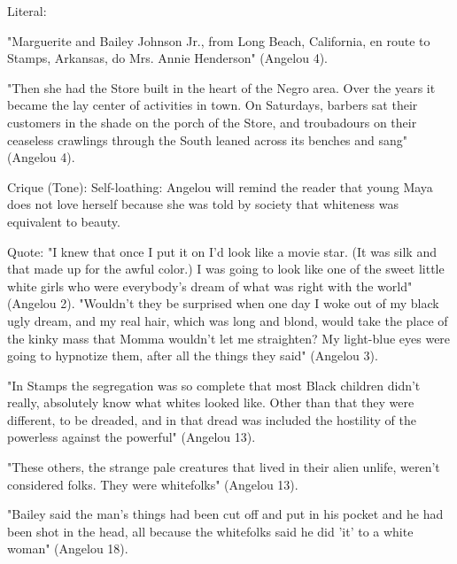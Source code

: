 
Literal:

"Marguerite and Bailey Johnson Jr., from Long Beach, California, en route to Stamps, Arkansas, do Mrs. Annie Henderson" (Angelou 4).

"Then she had the Store built in the heart of the Negro area. Over the years it became the lay center of activities in town. On Saturdays, barbers sat their customers in the shade on the porch of the Store, and troubadours on their ceaseless crawlings through the South leaned across its benches and sang" (Angelou 4).

Crique (Tone): 
Self-loathing: Angelou will remind the reader that young Maya does not love herself because she was told by society that whiteness was equivalent to beauty.

Quote:
"I knew that once I put it on I'd look like a movie star. (It was silk and that made up for the awful color.) I was going to look like one of the sweet little white girls who were everybody's dream of what was right with the world" (Angelou 2).
"Wouldn't they be surprised when one day I woke out of my black ugly dream, and my real hair, which was long and blond, would take the place of the kinky mass that Momma wouldn't let me straighten? My light-blue eyes were going to hypnotize them, after all the things they said" (Angelou 3).



"In Stamps the segregation was so complete that most Black children didn't really, absolutely know what whites looked like. Other than that they were different, to be dreaded, and in that dread was included the hostility of the powerless against the powerful" (Angelou 13).

"These others, the strange pale creatures that lived in their alien unlife, weren't considered folks. They were whitefolks" (Angelou 13).


"Bailey said the man's things had been cut off and put in his pocket and he had been shot in the head, all because the whitefolks said he did 'it' to a white woman" (Angelou 18).


